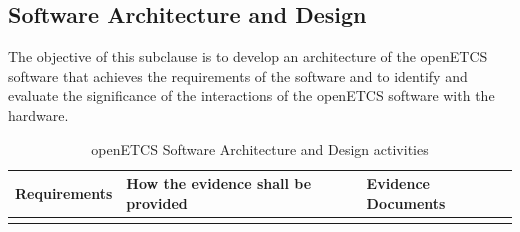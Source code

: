 \documentclass{template/openetcs_report}
\begin{document}
\subsection{Software Architecture and Design}
\label{arc-sw}
\begin{flushleft}
The objective of this subclause is to develop an architecture of the openETCS software that achieves the requirements of the software and to identify and evaluate the significance of the interactions of the openETCS software with the hardware.
\end{flushleft}
{\footnotesize\sffamily\centering
\begin{longtable}{|p{2cm}|p{9cm}|p{3cm}|}
\caption{openETCS Software Architecture and Design activities}\\
\hline
\bfseries Requirements & \bfseries How the evidence shall be provided & \bfseries Evidence Documents\\
\hline
\hline
\endhead
\hline
\endfoot


\end{longtable}}
\end{document}
